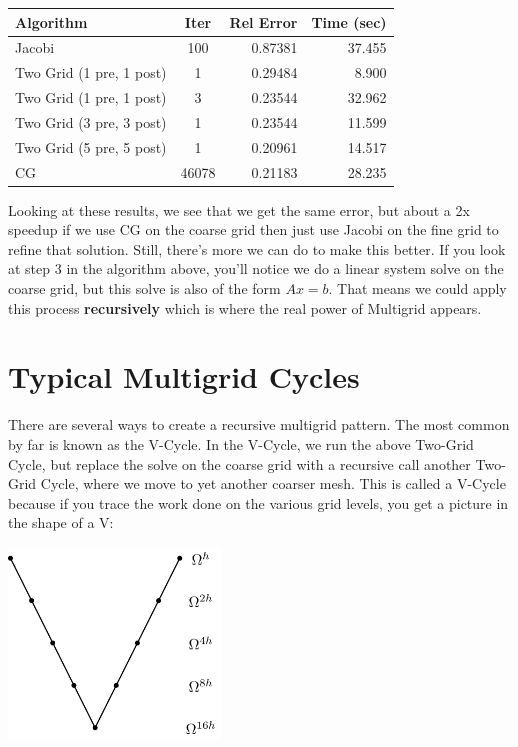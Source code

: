 \documentclass[11pt]{article}
\begin{document}
\begin{center}
\begin{tabular}{lcrr}
  Algorithm & Iter & Rel Error & Time (sec) \\
  \hline
  Jacobi                   & 100   &  0.87381  & 37.455 \\
  Two Grid (1 pre, 1 post) & 1	   &  0.29484  &  8.900 \\
  Two Grid (1 pre, 1 post) & 3	   &  0.23544  & 32.962 \\
  Two Grid (3 pre, 3 post) & 1	   &  0.23544  & 11.599 \\
  Two Grid (5 pre, 5 post) & 1     &  0.20961  & 14.517 \\
  CG                       & 46078 &  0.21183  & 28.235
\end{tabular}
\end{center}    

    
    Looking at these results, we see that we get the same error, but about a
2x speedup if we use CG on the coarse grid then just use Jacobi on the
fine grid to refine that solution. Still, there's more we can do to make
this better. If you look at step 3 in the algorithm above, you'll notice
we do a linear system solve on the coarse grid, but this solve is also
of the form \(Ax = b\). That means we could apply this process
\textbf{recursively} which is where the real power of Multigrid appears.

    \hypertarget{typical-multigrid-cycles}{%
\section{Typical Multigrid Cycles}\label{typical-multigrid-cycles}}

There are several ways to create a recursive multigrid pattern. The most
common by far is known as the V-Cycle. In the V-Cycle, we
run the above Two-Grid Cycle, but replace the solve on the coarse grid
with a recursive call another Two-Grid Cycle, where we move to yet
another coarser mesh. This is called a V-Cycle because if you trace the
work done on the various grid levels, you get a picture in the shape of
a V:
\begin{center}
  \includegraphics[height=2in]{../Graphics/V-Cycle-Graphic.png}
\end{center}
\end{document}
